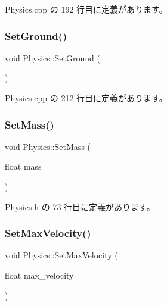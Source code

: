  Physics.\+cpp の 192 行目に定義があります。

\mbox{\label{class_physics_a5bb34919242bdb3472e574b7e024b7e7}} 
\subsubsection{\texorpdfstring{Set\+Ground()}{SetGround()}}
{\footnotesize\ttfamily void Physics\+::\+Set\+Ground (\begin{DoxyParamCaption}{ }\end{DoxyParamCaption})\hspace{0.3cm}{\ttfamily [private]}}



 Physics.\+cpp の 212 行目に定義があります。

\mbox{\label{class_physics_a7a6eac8c5f6d7db0baef290710825085}} 
\subsubsection{\texorpdfstring{Set\+Mass()}{SetMass()}}
{\footnotesize\ttfamily void Physics\+::\+Set\+Mass (\begin{DoxyParamCaption}\item[{float}]{mass }\end{DoxyParamCaption})\hspace{0.3cm}{\ttfamily [inline]}}



 Physics.\+h の 73 行目に定義があります。

\mbox{\label{class_physics_afd9e36bb94e921a41818f261df4205d0}} 
\subsubsection{\texorpdfstring{Set\+Max\+Velocity()}{SetMaxVelocity()}}
{\footnotesize\ttfamily void Physics\+::\+Set\+Max\+Velocity (\begin{DoxyParamCaption}\item[{float}]{max\+\_\+velocity }\end{DoxyParamCaption})\hspace{0.3cm}{\ttfamily [inline]}}



